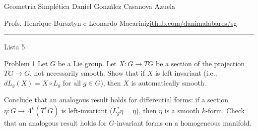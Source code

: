 
\usepackage[style=authortitle-terse,backend=bibtex]{biblatex}




\begin{minipage}{\textwidth}
	\begin{minipage}{1\textwidth}
		Geometria Simpl\'etica \hfill Daniel González Casanova Azuela
		
		{\small Profs. Henrique Bursztyn e Leonardo Macarini\hfill\href{https://github.com/danimalabares/sg}{github.com/danimalabares/sg}}
	\end{minipage}
\end{minipage}\vspace{.2cm}\hrule

\vspace{10pt}
{\huge Lista 5}

\tableofcontents

\begin{thing1}{Problem 1}\leavevmode
	Let  $G$ be a Lie group. Let $X:G\longrightarrow TG$ be a section of the projection $TG\longrightarrow G$, not necessarily smooth. Show that if  $X$ is left invariant (i.e., $dL_g(X)=X\circ L_g$ for all $g\in G$), then $X$ is automatically smooth.

	Conclude that an analogous result holds for differential forms: if a section $\eta:G\to \Lambda^{k}(T^*G)$ is left-invariant ($L^*_g\eta=\eta$), then $\eta$ is a smooth $k$-form. Check that an analogous result holds for $G$-invariant forms on a homogeneous manifold.
\end{thing1}

